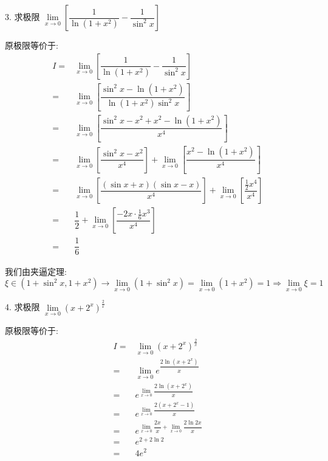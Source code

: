 3. 求极限 $\lim\limits_{x\to 0}[\dfrac{1}{\ln(1+x^{2})}-\dfrac{1}{\sin^{2}x}]$
\begin{solution}

	原极限等价于:
	\begin{align*}
		I = & \lim\limits_{x\to 0}[\dfrac{1}{\ln(1+x^{2})}-\dfrac{1}{\sin^{2}x}]\\
		  = & \lim\limits_{x\to 0}[\dfrac{\sin^{2}x-\ln(1+x^{2})}{\ln(1+x^{2})\sin^{2}x}]\\
		  = & \lim\limits_{x\to 0}[\dfrac{\sin^{2}x-x^{2}+x^{2}-\ln(1+x^{2})}{x^{4}}]\\
		  = & \lim\limits_{x\to 0}[\dfrac{\sin^{2}x-x^{2}}{x^{4}}]+\lim\limits_{x\to 0}[\dfrac{x^{2}-\ln(1+x^{2})}{x^{4}}]\\
		  = & \lim\limits_{x\to 0}[\dfrac{(\sin x+x)(\sin x-x)}{x^{4}}]+\lim\limits_{x\to 0}[\dfrac{\frac{1}{2}x^{4}}{x^{4}}]\\
		  = & \dfrac{1}{2}+\lim\limits_{x\to 0}[\dfrac{-2x\cdot\frac{1}{6}x^{3}}{x^{4}}]\\ 
		  = & \dfrac{1}{6}
	\end{align*}
	
	我们由夹逼定理: $\xi\in(1+\sin^{2}x,1+x^{2})\to \lim\limits_{x\to 0}(1+\sin^{2}x) = \lim\limits_{x\to 0} (1+x^{2}) = 1\Rightarrow \lim\limits_{x\to 0}\xi = 1$
\end{solution}

4. 求极限 $\lim\limits_{x\to 0}(x+2^{x})^{\frac{2}{x}}$
\begin{solution}
	
	原极限等价于:
	\begin{align*}
		I = & \lim\limits_{x\to 0}(x+2^{x})^{\frac{2}{x}}\\
		  = & \lim\limits_{x\to 0}e^{\dfrac{2\ln(x+2^{x})}{x}}\\
		  = & e^{\lim\limits_{x\to 0}\dfrac{2\ln(x+2^{x})}{x}}\\
		  = & e^{\lim\limits_{x\to 0}\dfrac{2(x+2^{x}-1)}{x}}\\
		  = & e^{\lim\limits_{x\to 0}\dfrac{2x}{x}+\lim\limits_{x\to 0}\dfrac{2\ln 2x}{x}}\\
		  = & e^{2+2\ln 2}\\
		  = & 4e^{2}
	\end{align*}
\end{solution}


